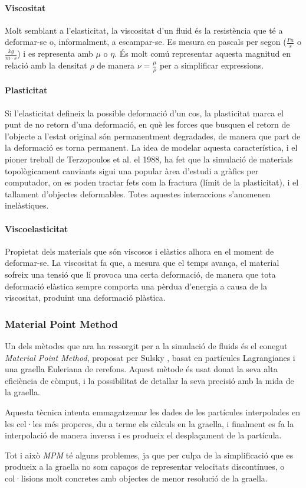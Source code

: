 \documentclass[a4paper]{report}
\begin{document}
	\paragraph{\quad Viscositat} Molt semblant a l'elasticitat, la viscositat d'un fluid és la resistència que té a deformar-se o, informalment, a escampar-se. Es mesura en pascals per segon ($\frac{Pa}{s}$ o $\frac{kg}{m \cdot s}$) i es representa amb $\mu$ o $\eta$. És molt comú representar aquesta magnitud en relació amb la densitat $\rho$ de manera $\nu = \frac{\mu}{\rho}$ per a simplificar expressions.
	\paragraph{\quad Plasticitat} Si l'elasticitat defineix la possible deformació d'un cos, la plasticitat marca el punt de no retorn d'una deformació, en què les forces que busquen el retorn de l'objecte a l'estat original són permanentment degradades, de manera que part de la deformació es torna permanent. La idea de modelar aquesta característica, i el pioner treball de Terzopoulos et al. \cite{Terzopoulos:1988:MID:378456.378522} el 1988, ha fet que la simulació de materials topològicament canviants sigui una popular àrea d'estudi a gràfics per computador, on es poden tractar fets com la fractura (límit de la plasticitat), i el tallament d'objectes deformables. Totes aquestes interaccions s'anomenen inelàstiques.
	\paragraph{\quad Viscoelasticitat} Propietat dels materials que són viscosos i elàstics alhora en el moment de deformar-se. La viscositat fa que, a mesura que el temps avança, el material sofreix una tensió que li provoca una certa deformació, de manera que tota deformació elàstica sempre comporta una pèrdua d'energia a causa de la viscositat, produint una deformació plàstica.
	
	\subsubsection[MPM]{Material Point Method}
	Un dels mètodes que ara ha ressorgit per a la simulació de fluids és el conegut \textit{Material Point Method}, proposat per Sulsky \cite{Sulsky1995}, basat en partícules Lagrangianes i una graella Euleriana de rerefons. Aquest mètode és usat donat la seva alta eficiència de còmput, i la possibilitat de detallar la seva precisió amb la mida de la graella. \par
	Aquesta tècnica intenta emmagatzemar les dades de les partícules interpolades en les cel·les més properes, du a terme els càlculs en la graella, i finalment es fa la interpolació de manera inversa i es produeix el desplaçament de la partícula. \par
	Tot i això \textit{MPM} té alguns problemes, ja que per culpa de la simplificació que es produeix a la graella no som capaços de representar velocitats discontínues, o col·lisions molt concretes amb objectes de menor resolució de la graella. 
	
\end{document}
